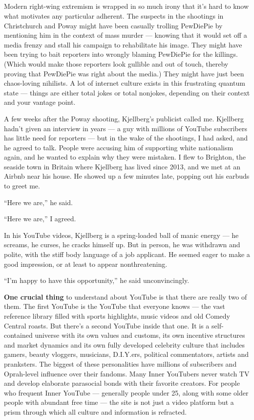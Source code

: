 \subsection{}

Modern right-wing extremism is wrapped in so much irony that it's hard
to know what motivates any particular adherent. The suspects in the
shootings in Christchurch and Poway might have been casually trolling
PewDiePie by mentioning him in the context of mass murder --- knowing
that it would set off a media frenzy and stall his campaign to
rehabilitate his image. They might have been trying to bait reporters
into wrongly blaming PewDiePie for the killings. (Which would make those
reporters look gullible and out of touch, thereby proving that PewDiePie
was right about the media.) They might have just been chaos-loving
nihilists. A lot of internet culture exists in this frustrating quantum
state --- things are either total jokes or total nonjokes, depending on
their context and your vantage point.

A few weeks after the Poway shooting, Kjellberg's publicist called me.
Kjellberg hadn't given an interview in years --- a guy with millions of
YouTube subscribers has little need for reporters --- but in the wake of
the shootings, I had asked, and he agreed to talk. People were accusing
him of supporting white nationalism again, and he wanted to explain why
they were mistaken. I flew to Brighton, the seaside town in Britain
where Kjellberg has lived since 2013, and we met at an Airbnb near his
house. He showed up a few minutes late, popping out his earbuds to greet
me.

``Here we are,'' he said.

``Here we are,'' I agreed.

In his YouTube videos, Kjellberg is a spring-loaded ball of manic energy
--- he screams, he curses, he cracks himself up. But in person, he was
withdrawn and polite, with the stiff body language of a job applicant.
He seemed eager to make a good impression, or at least to appear
nonthreatening.

``I'm happy to have this opportunity,'' he said unconvincingly.

\textbf{One crucial thing} to understand about YouTube is that there are
really two of them. The first YouTube is the YouTube that everyone knows
--- the vast reference library filled with sports highlights, music
videos and old Comedy Central roasts. But there's a second YouTube
inside that one. It is a self-contained universe with its own values and
customs, its own incentive structures and market dynamics and its own
fully developed celebrity culture that includes gamers, beauty vloggers,
musicians, D.I.Y.ers, political commentators, artists and pranksters.
The biggest of these personalities have millions of subscribers and
Oprah-level influence over their fandoms. Many Inner YouTubers never
watch TV and develop elaborate parasocial bonds with their favorite
creators. For people who frequent Inner YouTube --- generally people
under 25, along with some older people with abundant free time --- the
site is not just a video platform but a prism through which all culture
and information is refracted.


